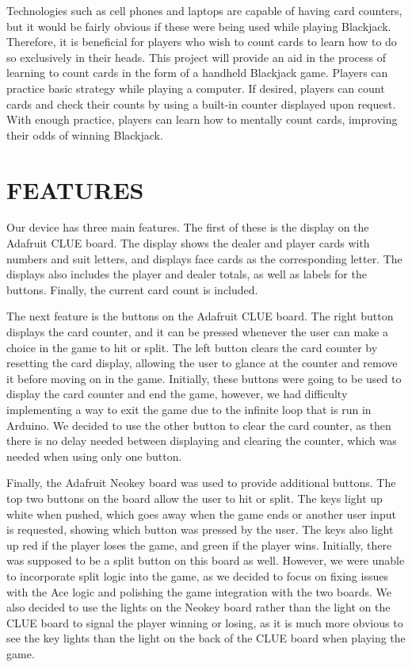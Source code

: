 \documentclass[12pt]{article}
\begin{document}
Technologies such as cell phones and laptops are capable of having card counters, but it would be fairly obvious if these were being used while playing Blackjack. Therefore, it is beneficial for players who wish to count cards to learn how to do so exclusively in their heads. This project will provide an aid in the process of learning to count cards in the form of a handheld Blackjack game. Players can practice basic strategy while playing a computer. If desired, players can count cards and check their counts by using a built-in counter displayed upon request. With enough practice, players can learn how to mentally count cards, improving their odds of winning Blackjack.

\section{FEATURES}
Our device has three main features. The first of these is the display on the Adafruit CLUE board. The display shows the dealer and player cards with numbers and suit letters, and displays face cards as the corresponding letter. The displays also includes the player and dealer totals, as well as labels for the buttons. Finally, the current card count is included.

The next feature is the buttons on the Adafruit CLUE board. The right button displays the card counter, and it can be pressed whenever the user can make a choice in the game to hit or split. The left button clears the card counter by resetting the card display, allowing the user to glance at the counter and remove it before moving on in the game. Initially, these buttons were going to be used to display the card counter and end the game, however, we had difficulty implementing a way to exit the game due to the infinite loop that is run in Arduino. We decided to use the other button to clear the card counter, as then there is no delay needed between displaying and clearing the counter, which was needed when using only one button.

Finally, the Adafruit Neokey board was used to provide additional buttons. The top two buttons on the board allow the user to hit or split. The keys light up white when pushed, which goes away when the game ends or another user input is requested, showing which button was pressed by the user. The keys also light up red if the player loses the game, and green if the player wins. Initially, there was supposed to be a split button on this board as well. However, we were unable to incorporate split logic into the game, as we decided to focus on fixing issues with the Ace logic and polishing the game integration with the two boards. We also decided to use the lights on the Neokey board rather than the light on the CLUE board to signal the player winning or losing, as it is much more obvious to see the key lights than the light on the back of the CLUE board when playing the game.
\end{document}
